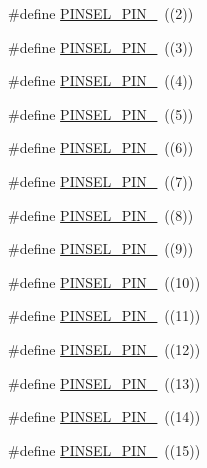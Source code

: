 \begin{DoxyCompactItemize}
\item 
\#define \hyperlink{group___p_i_n_s_e_l___public___macros_ga9d1834ec06bf0543870697aff2019b9f}{P\+I\+N\+S\+E\+L\+\_\+\+P\+I\+N\+\_}~((2))
\item 
\#define \hyperlink{group___p_i_n_s_e_l___public___macros_ga181d387f7b6aa5f8d11d11571e770792}{P\+I\+N\+S\+E\+L\+\_\+\+P\+I\+N\+\_}~((3))
\item 
\#define \hyperlink{group___p_i_n_s_e_l___public___macros_ga160a6ed203a310444304dd0c284bb698}{P\+I\+N\+S\+E\+L\+\_\+\+P\+I\+N\+\_}~((4))
\item 
\#define \hyperlink{group___p_i_n_s_e_l___public___macros_ga5979b18582a24b9cb7d34683177f2e2c}{P\+I\+N\+S\+E\+L\+\_\+\+P\+I\+N\+\_}~((5))
\item 
\#define \hyperlink{group___p_i_n_s_e_l___public___macros_gab60e9a23a646c4f8525b7731a14e98b9}{P\+I\+N\+S\+E\+L\+\_\+\+P\+I\+N\+\_}~((6))
\item 
\#define \hyperlink{group___p_i_n_s_e_l___public___macros_gafeb1600b848f4638595c4e9df38189cc}{P\+I\+N\+S\+E\+L\+\_\+\+P\+I\+N\+\_}~((7))
\item 
\#define \hyperlink{group___p_i_n_s_e_l___public___macros_gac8ba0c15c6f09a073231c8819f5d5815}{P\+I\+N\+S\+E\+L\+\_\+\+P\+I\+N\+\_}~((8))
\item 
\#define \hyperlink{group___p_i_n_s_e_l___public___macros_ga7c6bcb2cc66e084d83758723ba42a9b8}{P\+I\+N\+S\+E\+L\+\_\+\+P\+I\+N\+\_}~((9))
\item 
\#define \hyperlink{group___p_i_n_s_e_l___public___macros_ga26ae3a32a8ac30b72df02438baadfdce}{P\+I\+N\+S\+E\+L\+\_\+\+P\+I\+N\+\_}~((10))
\item 
\#define \hyperlink{group___p_i_n_s_e_l___public___macros_gaf04d143c6e91c484c6d113922e8f2936}{P\+I\+N\+S\+E\+L\+\_\+\+P\+I\+N\+\_}~((11))
\item 
\#define \hyperlink{group___p_i_n_s_e_l___public___macros_ga9ef4030bbae13e89349b3c3ee5e7cbe3}{P\+I\+N\+S\+E\+L\+\_\+\+P\+I\+N\+\_}~((12))
\item 
\#define \hyperlink{group___p_i_n_s_e_l___public___macros_gad10a5248395d859c7c831dd35a3ef81a}{P\+I\+N\+S\+E\+L\+\_\+\+P\+I\+N\+\_}~((13))
\item 
\#define \hyperlink{group___p_i_n_s_e_l___public___macros_ga953c421f0a1e597783224c8fbd2402ef}{P\+I\+N\+S\+E\+L\+\_\+\+P\+I\+N\+\_}~((14))
\item 
\#define \hyperlink{group___p_i_n_s_e_l___public___macros_ga0687cf1015a3d95844c2df3584797d75}{P\+I\+N\+S\+E\+L\+\_\+\+P\+I\+N\+\_}~((15))

\end{DoxyCompactItemize}
